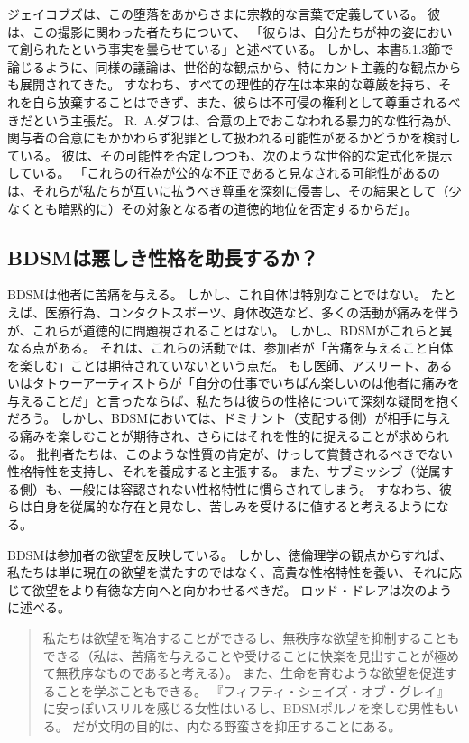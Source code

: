 \documentclass[paper=a4,book,openany]{jlreq} \usepackage{mystyle}
\begin{document}
ジェイコブズは、この堕落をあからさまに宗教的な言葉で定義している。
彼は、この撮影に関わった者たちについて、 「彼らは、自分たちが神の姿において創られたという事実を曇らせている」\citep{jacobs03:_in_which_noah_millm_i}と述べている。
しかし、本書5.1.3節で論じるように、同様の議論は、世俗的な観点から、特にカント主義的な観点からも展開されてきた。
すなわち、すべての理性的存在は本来的な尊厳を持ち、それを自ら放棄することはできず、また、彼らは不可侵の権利として尊重されるべきだという主張だ。
R.~A.ダフは、合意の上でおこなわれる暴力的な性行為が、関与者の合意にもかかわらず犯罪として扱われる可能性があるかどうかを検討している。
彼は、その可能性を否定しつつも、次のような世俗的な定式化を提示している。
「これらの行為が公的な不正であると見なされる可能性があるのは、それらが私たちが互いに払うべき尊重を深刻に侵害し、その結果として（少なくとも暗黙的に）その対象となる者の道徳的地位を否定するからだ」\citep[p.232]{duff14:_towar_modes_legal_moral}。

\subsection{BDSMは悪しき性格を助長するか？}

BDSMは他者に苦痛を与える。
しかし、これ自体は特別なことではない。
たとえば、医療行為、コンタクトスポーツ、身体改造など、多くの活動が痛みを伴うが、これらが道徳的に問題視されることはない。
しかし、BDSMがこれらと異なる点がある。
それは、これらの活動では、参加者が「苦痛を与えること自体を楽しむ」ことは期待されていないという点だ。
もし医師、アスリート、あるいはタトゥーアーティストらが「自分の仕事でいちばん楽しいのは他者に痛みを与えることだ」と言ったならば、私たちは彼らの性格について深刻な疑問を抱くだろう。
しかし、BDSMにおいては、ドミナント（支配する側）が相手に与える痛みを楽しむことが期待され、さらにはそれを性的に捉えることが求められる。
批判者たちは、このような性質の肯定が、けっして賞賛されるべきでない性格特性を支持し、それを養成すると主張する。
また、サブミッシブ（従属する側）も、一般には容認されない性格特性に慣らされてしまう。
すなわち、彼らは自身を従属的な存在と見なし、苦しみを受けるに値すると考えるようになる。

BDSMは参加者の欲望を反映している。
しかし、徳倫理学の観点からすれば、私たちは単に現在の欲望を満たすのではなく、高貴な性格特性を養い、それに応じて欲望をより有徳な方向へと向かわせるべきだ。
ロッド・ドレアは次のように述べる。

\begin{quote}
  私たちは欲望を陶冶することができるし、無秩序な欲望を抑制することもできる（私は、苦痛を与えることや受けることに快楽を見出すことが極めて無秩序なものであると考える）。
また、生命を育むような欲望を促進することを学ぶこともできる。
『フィフティ・シェイズ・オブ・グレイ』に安っぽいスリルを感じる女性はいるし、BDSMポルノを楽しむ男性もいる。
だが文明の目的は、内なる野蛮さを抑圧することにある。
\citep{dreher12:_million_shades_of_gross}
\end{quote}
\end{document}
